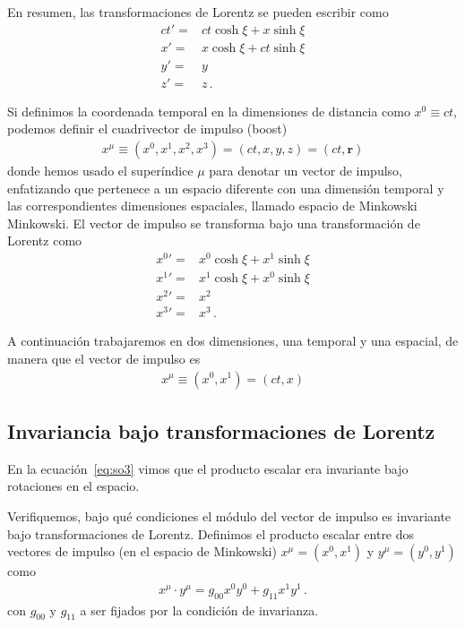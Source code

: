 \documentclass[11pt,a4paper]{book}
\begin{document}
En resumen, las transformaciones de Lorentz se pueden escribir como
\[
\boxed{
\begin{aligned}    
    ct' =& ct\cosh\xi + x\sinh\xi \\
    x' = &x\cosh\xi + ct\sinh\xi\\
    y' = & y\\
    z' = &z\,.
\end{aligned}
}
\]

Si definimos la coordenada temporal en la dimensiones de distancia como $x^0\equiv ct$, podemos definir el cuadrivector de impulso (boost)
\begin{align}
    x^\mu \equiv \left(x^0, x^1, x^2,x^3 \right) = \left(ct, x, y,z \right)
    = (ct,\boldsymbol{r})
\end{align}
donde hemos usado el superíndice $\mu$ para denotar un vector de impulso, enfatizando que pertenece a un espacio diferente con una dimensión temporal y las correspondientes dimensiones espaciales, llamado espacio de Minkowski Minkowski.
El vector de impulso se transforma bajo una transformación de Lorentz como
\[
\boxed{
\begin{aligned}    
    {x^0}' =& x^0\cosh\xi + x^1\sinh\xi \\
    {x^1}' = &x^1\cosh\xi + x^0\sinh\xi\\
    {x^2}' = & x^2\\
    {x^3}' = &x^3\,.
\end{aligned}
}
\]

A continuación trabajaremos en dos dimensiones, una temporal y una espacial, de manera que el vector de impulso es
\begin{align}
\label{eq:bivector}
    x^\mu \equiv \left(x^0, x^1 \right) = \left(ct, x \right)
\end{align}

\subsection{Invariancia bajo transformaciones de Lorentz}
En la ecuación~\eqref{eq:so3} vimos que el producto escalar era invariante bajo rotaciones en el espacio.

Verifiquemos, bajo qué condiciones el módulo del vector de impulso es invariante bajo transformaciones de Lorentz. 
Definimos el producto escalar entre dos vectores de impulso (en el espacio de Minkowski)
$x^\mu = (x^0,x^1)$ y $y^\mu = (y^0,y^1) $ como
\begin{align}
    x^\mu \cdot y^\mu = g_{00} x^0 y^0 + g_{11} x^1 y^1\,.
\end{align}
con $g_{00}$ y $g_{11}$ a ser fijados por la condición de invarianza. 
\end{document}

